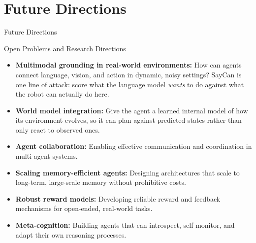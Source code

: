 \section{Future Directions}
\begin{frame}{}
  \LARGE Future Directions
\end{frame}

\begin{frame}{Open Problems and Research Directions}
  \begin{itemize}
    \item[\textcolor{red}{$\blacktriangleright$}] \textbf{Multimodal grounding in real-world environments:} How
      can agents connect language, vision, and action in dynamic, noisy settings? SayCan is one line of
      attack: score what the language model \emph{wants} to do against what the robot can actually do here.
    \item[\textcolor{red}{$\blacktriangleright$}] \textbf{World model integration:} Give the agent a learned
      internal model of how its environment evolves, so it can plan against predicted states rather than only
      react to observed ones.
    \item[\textcolor{red}{$\blacktriangleright$}] \textbf{Agent collaboration:} Enabling effective communication and coordination in multi-agent systems.
    \item[\textcolor{red}{$\blacktriangleright$}] \textbf{Scaling memory-efficient agents:} Designing architectures that scale to long-term, large-scale memory without prohibitive costs.
    \item[\textcolor{red}{$\blacktriangleright$}] \textbf{Robust reward models:} Developing reliable reward and feedback mechanisms for open-ended, real-world tasks.
    \item[\textcolor{red}{$\blacktriangleright$}] \textbf{Meta-cognition:} Building agents that can introspect, self-monitor, and adapt their own reasoning processes.
  \end{itemize}
\end{frame}
